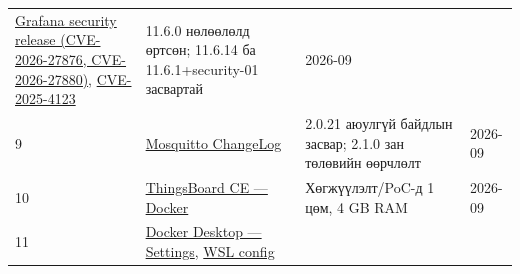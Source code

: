 \begin{longtable}[]{@{}llll@{}}
\begin{minipage}[t]{0.22\columnwidth}
\href{https://grafana.com/blog/grafana-security-release-critical-and-high-severity-security-fixes-for-cve-2026-27876-and-cve-2026-27880/}{Grafana security release (CVE-2026-27876, CVE-2026-27880)}, \href{https://grafana.com/blog/grafana-security-release-high-severity-security-fix-for-cve-2025-4123/}{CVE-2025-4123}\strut
\end{minipage} & \begin{minipage}[t]{0.22\columnwidth}\raggedright
11.6.0 нөлөөлөлд өртсөн; 11.6.14 ба 11.6.1+security-01 засвартай\strut
\end{minipage} & \begin{minipage}[t]{0.22\columnwidth}\raggedright
2026-09\strut
\end{minipage}\tabularnewline
\begin{minipage}[t]{0.22\columnwidth}\raggedright
9\strut
\end{minipage} & \begin{minipage}[t]{0.22\columnwidth}\raggedright
\href{https://mosquitto.org/ChangeLog.txt}{Mosquitto ChangeLog}\strut
\end{minipage} & \begin{minipage}[t]{0.22\columnwidth}\raggedright
2.0.21 аюулгүй байдлын засвар; 2.1.0 зан төлөвийн өөрчлөлт\strut
\end{minipage} & \begin{minipage}[t]{0.22\columnwidth}\raggedright
2026-09\strut
\end{minipage}\tabularnewline
\begin{minipage}[t]{0.22\columnwidth}\raggedright
10\strut
\end{minipage} & \begin{minipage}[t]{0.22\columnwidth}\raggedright
\href{https://thingsboard.io/docs/installation/docker/}{ThingsBoard CE --- Docker}\strut
\end{minipage} & \begin{minipage}[t]{0.22\columnwidth}\raggedright
Хөгжүүлэлт/PoC-д 1 цөм, 4 GB RAM\strut
\end{minipage} & \begin{minipage}[t]{0.22\columnwidth}\raggedright
2026-09\strut
\end{minipage}\tabularnewline
\begin{minipage}[t]{0.22\columnwidth}\raggedright
11\strut
\end{minipage} & \begin{minipage}[t]{0.22\columnwidth}\raggedright
\href{https://docs.docker.com/desktop/settings-and-maintenance/settings/}{Docker Desktop --- Settings}, \href{https://learn.microsoft.com/en-us/windows/wsl/wsl-config}{WSL config}\strut

\end{minipage}
\end{longtable}
